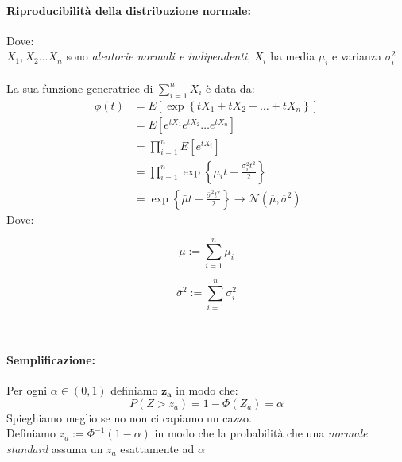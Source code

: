 \documentclass[]{article}
\begin{document}
    \paragraph{Riproducibilità della distribuzione normale:} Dove: \\
    $X_1, X_2 \ldots X_n$ sono \textit{aleatorie normali e indipendenti}, $X_i$ ha media $\mu_i$ e varianza $\sigma^{2}_i$ \\ \\
    La sua funzione generatrice di $\sum_{i = 1}^{n} X_i$ è data da:
    \begin{equation}
        \begin{aligned}
            \phi(t) & =E\left[\exp \left\{t X_1+t X_2+\ldots+t X_n\right\}\right] \\
            & =E\left[e^{t X_1} e^{t X_2} \ldots e^{t X_n}\right] \\
            & =\prod_{i=1}^n E\left[e^{t X_i}\right] \\
            & =\prod_{i=1}^n \exp \left\{\mu_i t+\frac{\sigma_i^2 t^2}{2}\right\} \\
            & =\exp \left\{\bar{\mu} t+\frac{\bar{\sigma}^2 t^2}{2}\right\} \longrightarrow \mathcal{N}(\overline{\mu}, \overline{\sigma}^2)
        \end{aligned}
    \end{equation}
    Dove: \\
    \begin{minipage}{0.45\textwidth}
        \[ \overline{\mu} := \sum_{i = 1}^{n} \mu_i \]
    \end{minipage}
    \begin{minipage}{0.45\textwidth}
        \[ \overline{\sigma}^2 := \sum_{i = 1}^{n} \sigma^2_i\]
    \end{minipage} \\

    \paragraph{Semplificazione:} Per ogni $\alpha \in (0,1)$ definiamo $\boldsymbol{z_a}$ in modo che:
    \[ P(Z > z_a) = 1 - \Phi(Z_a) = \alpha \] 
    Spieghiamo meglio se no non ci capiamo un cazzo. \\
    Definiamo $z_a := \Phi^{-1}(1 - \alpha)$ in modo che la probabilità che una \textit{normale standard} assuma un $z_a$ esattamente ad $\alpha$
\end{document}

